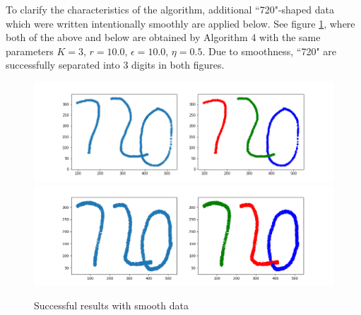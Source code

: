 \documentclass[twoside,11pt]{article}
\begin{document}
To clarify the characteristics of the algorithm, additional ``720"-shaped data which were written intentionally smoothly are applied below.  See figure \ref{smooth_720}, where both of the above and below are obtained by Algorithm 4 with the same parameters $K = 3$, $r = 10.0$, $\epsilon = 10.0$, $\eta = 0.5$. Due to smoothness, ``720" are successfully separated into 3 digits in both figures.

\begin{figure}[htbp]
\centering
\vspace{-1em}
\includegraphics[width=0.8  \textwidth]{smooth_720_1.png}
\includegraphics[width=0.8  \textwidth]{smooth_720_2.png}
\vspace{-1em}
\caption{Successful results with smooth data}
\label{smooth_720}
\end{figure}
\end{document}
